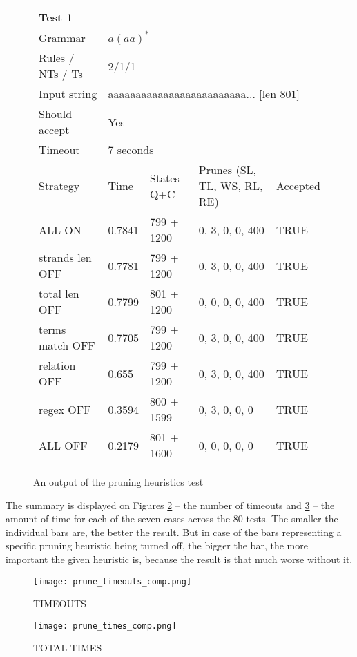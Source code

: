 \begin{figure}[h]
  \caption{An output of the pruning heuristics test}
  \label{tab:prune_heuristics_table}
\begin{tabular}{ |l|l|l|l|l|  }
  \hline
  \multicolumn{5}{|l|}{Test 1} \\
  \hline
  Grammar & \multicolumn{4}{|l|}{$a(aa)^*$} \\
  Rules / NTs / Ts & \multicolumn{4}{|l|}{2/1/1} \\
  Input string & \multicolumn{4}{|l|}{aaaaaaaaaaaaaaaaaaaaaaaaa... [len 801]} \\
  Should accept & \multicolumn{4}{|l|}{Yes} \\
  Timeout & \multicolumn{4}{|l|}{7 seconds} \\
  \hline
  Strategy & Time & States Q+C & Prunes (SL, TL, WS, RL, RE)& Accepted \\
  \hline
  ALL ON & 0.7841 & 799 + 1200 & 0, 3, 0, 0, 400 & TRUE \\
  strands len OFF & 0.7781 & 799 + 1200 & 0, 3, 0, 0, 400 & TRUE \\
  total len OFF & 0.7799 & 801 + 1200 & 0, 0, 0, 0, 400 & TRUE \\
  terms match OFF & 0.7705 & 799 + 1200 & 0, 3, 0, 0, 400 & TRUE \\
  relation OFF & 0.655 & 799 + 1200 & 0, 3, 0, 0, 400 & TRUE \\
  regex OFF & 0.3594 & 800 + 1599 & 0, 3, 0, 0, 0 & TRUE \\
  ALL OFF & 0.2179 & 801 + 1600 & 0, 0, 0, 0, 0 & TRUE \\
  \hline
  \hline
\end{tabular}
\end{figure}

The summary is displayed on Figures \ref{fig:prune_timeouts_comp} -- the number of timeouts and \ref{fig:prune_times_comp} -- the amount of time for each of the seven cases across the 80 tests. The smaller the individual bars are, the better the result. But in case of the bars representing a specific pruning heuristic being turned off, the bigger the bar, the more important the given heuristic is, because the result is that much worse without it.

\begin{figure}[h]
  \texttt{[image: prune\_timeouts\_comp.png]}
  \caption{TIMEOUTS}
  \label{fig:prune_timeouts_comp}
\end{figure}

\begin{figure}[h]
  \texttt{[image: prune\_times\_comp.png]}
  \caption{TOTAL TIMES}
  \label{fig:prune_times_comp}
\end{figure}



